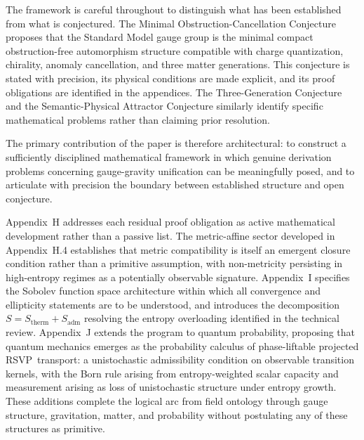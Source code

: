 \documentclass[12pt,a4paper]{article}
\newcommand{\RSVP}{\textrm{RSVP}}
\begin{document}
The framework is careful throughout to distinguish what has been established
from what is conjectured. The Minimal Obstruction-Cancellation Conjecture
proposes that the Standard Model gauge group is the minimal compact
obstruction-free automorphism structure compatible with charge quantization,
chirality, anomaly cancellation, and three matter generations. This conjecture
is stated with precision, its physical conditions are made explicit, and its
proof obligations are identified in the appendices. The Three-Generation
Conjecture and the Semantic-Physical Attractor Conjecture similarly identify
specific mathematical problems rather than claiming prior resolution.

The primary contribution of the paper is therefore architectural: to construct
a sufficiently disciplined mathematical framework in which genuine derivation
problems concerning gauge-gravity unification can be meaningfully posed, and
to articulate with precision the boundary between established structure and
open conjecture.

Appendix~H addresses each residual proof obligation as active mathematical
development rather than a passive list. The metric-affine sector developed
in Appendix~H.4 establishes that metric compatibility is itself an emergent
closure condition rather than a primitive assumption, with non-metricity
persisting in high-entropy regimes as a potentially observable signature.
Appendix~I specifies the Sobolev function space architecture within which
all convergence and ellipticity statements are to be understood, and
introduces the decomposition $S=S_\mathrm{therm}+S_\mathrm{adm}$ resolving
the entropy overloading identified in the technical review. Appendix~J
extends the program to quantum probability, proposing that quantum mechanics
emerges as the probability calculus of phase-liftable projected \RSVP\
transport: a unistochastic admissibility condition on observable transition
kernels, with the Born rule arising from entropy-weighted scalar capacity
and measurement arising as loss of unistochastic structure under entropy
growth. These additions complete the logical arc from field ontology through
gauge structure, gravitation, matter, and probability without postulating
any of these structures as primitive.

\newpage

\appendix
\renewcommand{\thesection}{\Alph{section}}
\setcounter{section}{0}
\end{document}
